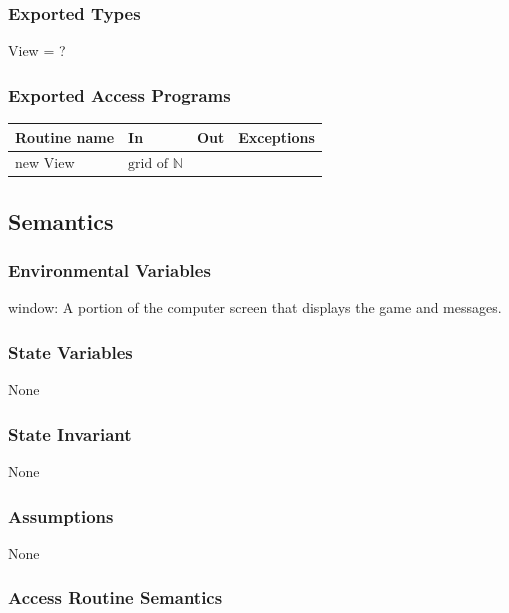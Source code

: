 \documentclass[12pt]{article}
\begin{document}
\subsubsection* {Exported Types}

View = ?

\subsubsection* {Exported Access Programs}

\begin{tabular}{| l | l | l | l |}
\hline
\textbf{Routine name} & \textbf{In} & \textbf{Out} & \textbf{Exceptions}\\
\hline
new View & $\text{grid of } \mathbb{N}$ & & \\
\hline

\end{tabular}

\subsection* {Semantics}

\subsubsection* {Environmental Variables}

window: A portion of the computer screen that displays the game and messages. 

\subsubsection* {State Variables}

None

\subsubsection* {State Invariant}

None

\subsubsection* {Assumptions}

None

\subsubsection* {Access Routine Semantics}
\end{document}
